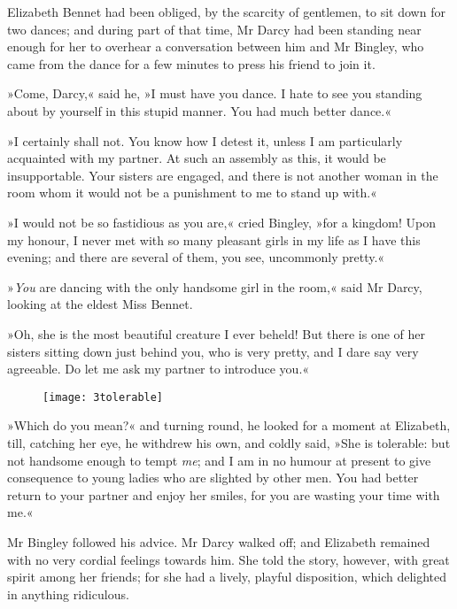 Elizabeth Bennet had been obliged, by the scarcity of gentlemen, to sit down for two dances; and during part of that time, Mr Darcy had been standing near enough for her to overhear a conversation between him and Mr Bingley, who came from the dance for a few minutes to press his friend to join it.

»Come, Darcy,« said he, »I must have you dance. I hate to see you standing about by yourself in this stupid manner. You had much better dance.«

»I certainly shall not. You know how I detest it, unless I am particularly acquainted with my partner. At such an assembly as this, it would be insupportable. Your sisters are engaged, and there is not another woman in the room whom it would not be a punishment to me to stand up with.«

»I would not be so fastidious as you are,« cried Bingley, »for a kingdom! Upon my honour, I never met with so many pleasant girls in my life as I have this evening; and there are several of them, you see, uncommonly pretty.«

»\textit{You} are dancing with the only handsome girl in the room,« said Mr Darcy, looking at the eldest Miss Bennet.

»Oh, she is the most beautiful creature I ever beheld! But there is one of her sisters sitting down just behind you, who is very pretty, and I dare say very agreeable. Do let me ask my partner to introduce you.«

\begin{figure}[tbh]
\centering
\texttt{[image: 3tolerable]}
\end{figure}

»Which do you mean?« and turning round, he looked for a moment at Elizabeth, till, catching her eye, he withdrew his own, and coldly said, »She is tolerable: but not handsome enough to tempt \textit{me}; and I am in no humour at present to give consequence to young ladies who are slighted by other men. You had better return to your partner and enjoy her smiles, for you are wasting your time with me.«



Mr Bingley followed his advice. Mr Darcy walked off; and Elizabeth remained with no very cordial feelings towards him. She told the story, however, with great spirit among her friends; for she had a lively, playful disposition, which delighted in anything ridiculous.

